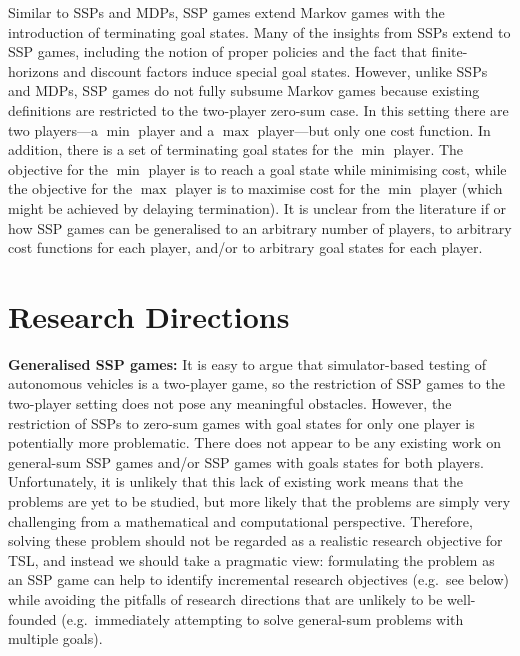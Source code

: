 \documentclass[10pt]{article}
\theoremstyle{plain}
\newenvironment{note}[1][]{\par\smallskip\noindent\textbf{#1}\rmfamily}{\smallskip}
\begin{document}
Similar to SSPs and MDPs, SSP games extend Markov games with the introduction of terminating goal states.
Many of the insights from SSPs extend to SSP games, including the notion of proper policies and the fact that finite-horizons and discount factors induce special goal states.
However, unlike SSPs and MDPs, SSP games do not fully subsume Markov games because existing definitions are restricted to the two-player zero-sum case.
In this setting there are two players---a $\min$ player and a $\max$ player---but only one cost function.
In addition, there is a set of terminating goal states for the $\min$ player.
The objective for the $\min$ player is to reach a goal state while minimising cost, while the objective for the $\max$ player is to maximise cost for the $\min$ player (which might be achieved by delaying termination).
It is unclear from the literature if or how SSP games can be generalised to an arbitrary number of players, to arbitrary cost functions for each player, and/or to arbitrary goal states for each player.

\section{Research Directions}

\begin{note}[Generalised SSP games:]
    It is easy to argue that simulator-based testing of autonomous vehicles is a two-player game, so the restriction of SSP games to the two-player setting does not pose any meaningful obstacles.
    However, the restriction of SSPs to zero-sum games with goal states for only one player is potentially more problematic.
    There does not appear to be any existing work on general-sum SSP games and/or SSP games with goals states for both players.
    Unfortunately, it is unlikely that this lack of existing work means that the problems are yet to be studied, but more likely that the problems are simply very challenging from a mathematical and computational perspective.
    Therefore, solving these problem should not be regarded as a realistic research objective for TSL, and instead we should take a pragmatic view: formulating the problem as an SSP game can help to identify incremental research objectives (e.g.\ see below) while avoiding the pitfalls of research directions that are unlikely to be well-founded (e.g.\ immediately attempting to solve general-sum problems with multiple goals).
\end{note}
\end{document}
